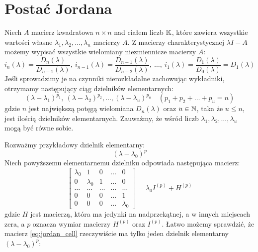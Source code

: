 \section{Postać Jordana}

Niech $A$ macierz kwadratowa $n \times n$ nad ciałem liczb $\mathbb{K}$, które zawiera wszystkie wartości własne $ \lambda_1, \lambda_2, \ldots, \lambda_n$ macierzy $A$. Z macierzy charakterystycznej $\lambda I - A$ możemy wypisać wszystkie wielomiany niezmiennicze macierzy $A$:
$$ i_{n}(\lambda) = \frac{D_{n}(\lambda)}{D_{n-1}(\lambda)}, \ i_{n-1}(\lambda) = \frac{D_{n-1}(\lambda)}{D_{n-2}(\lambda)}, \
\ldots, \ i_{1}(\lambda) = \frac{D_{1}(\lambda)}{D_{0}(\lambda)} = D_{1}(\lambda) $$
Jeśli sprowadzimy je na czynniki nierozkładalne zachowując wykładniki, otrzymamy następujący ciąg dzielników elementarnych:
\begin{equation}\label{eq:elementary_divisors}
(\lambda - \lambda_1)^{p_1}, \ (\lambda - \lambda_2)^{p_2}, \ldots, (\lambda - \lambda_u)^{p_u} \quad (p_1 + p_2 + \ldots + p_u = n)
\end{equation}
gdzie $n$ jest największą potęgą wielomiana $D_n(\lambda)$ oraz $u \in \mathbb{N}$, taka że $u \leq n$, jest ilością dzielników elementarnych. Zauważmy, że wśród liczb $\lambda_1, \lambda_2, \ldots, \lambda_u$ mogą być równe sobie.

Rozważmy przykładowy dzielnik elementarny:
$$ (\lambda - \lambda_0)^{p} $$
Niech powyższemu elementarnemu dzielniku odpowiada następująca macierz:
\begin{equation}\label{eq:jordan_cell}
    \begin{bmatrix} 
    \lambda_{0} & 1 & 0 & \dots & 0 \\
    0 & \lambda_{0} & 1 & \dots & 0 \\
    \dots & \dots & \dots & \dots & \dots \\
    0 & 0 & 0 & \dots & 1 \\
    0 & 0 & 0 & \dots & \lambda_{0} 
    \end{bmatrix} = \lambda_0I^{(p)} + H^{(p)}
\end{equation}
gdzie $H$ jest macierzą, która ma jedynki na nadprzekątnej, a w innych miejscach zera, a $p$ oznacza wymiar macierzy $H^{(p)}$ oraz $I^{(p)}$.
Łatwo możemy sprawdzić, że macierz \eqref{eq:jordan_cell} rzeczywiście ma tylko jeden dzielnik elementarny $ (\lambda - \lambda_0)^{p} $:

